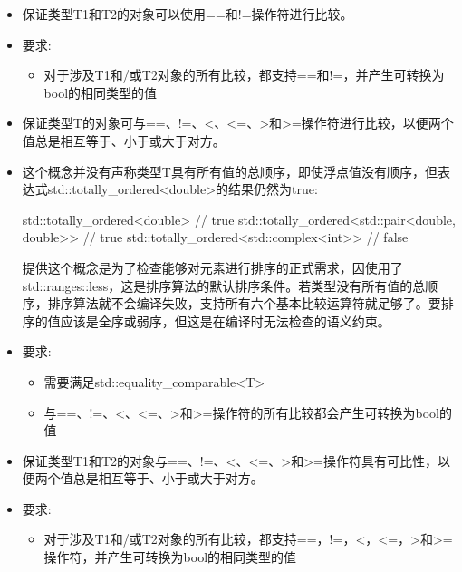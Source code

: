 
\begin{itemize}
\item
保证类型T1和T2的对象可以使用==和!=操作符进行比较。

\item
要求:
\begin{itemize}
\item
对于涉及T1和/或T2对象的所有比较，都支持==和!=，并产生可转换为bool的相同类型的值
\end{itemize}
\end{itemize}


\begin{itemize}
\item
保证类型T的对象可与==、!=、<、<=、>和>=操作符进行比较，以便两个值总是相互等于、小于或大于对方。

\item
这个概念并没有声称类型T具有所有值的总顺序，即使浮点值没有顺序，但表达式std::totally\_ordered<double>的结果仍然为true:

\begin{cpp}
std::totally_ordered<double> // true
std::totally_ordered<std::pair<double, double>> // true
std::totally_ordered<std::complex<int>> // false
\end{cpp}

提供这个概念是为了检查能够对元素进行排序的正式需求，因使用了std::ranges::less，这是排序算法的默认排序条件。若类型没有所有值的总顺序，排序算法就不会编译失败，支持所有六个基本比较运算符就足够了。要排序的值应该是全序或弱序，但这是在编译时无法检查的语义约束。

\item
要求:
\begin{itemize}
\item
需要满足std::equality\_comparable<T>

\item
与==、!=、<、<=、>和>=操作符的所有比较都会产生可转换为bool的值
\end{itemize}
\end{itemize}


\begin{itemize}
\item
保证类型T1和T2的对象与==、!=、<、<=、>和>=操作符具有可比性，以便两个值总是相互等于、小于或大于对方。

\item
要求:
\begin{itemize}
\item
对于涉及T1和/或T2对象的所有比较，都支持==，!=，<，<=，>和>=操作符，并产生可转换为bool的相同类型的值
\end{itemize}
\end{itemize}


